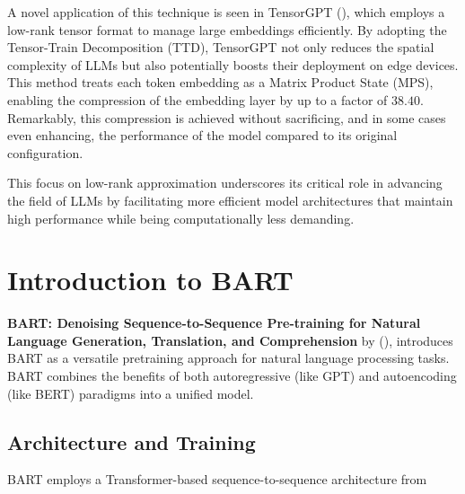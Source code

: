         A novel application of this technique is seen in TensorGPT (\cite{xu2023tensorgpt}), which employs a low-rank tensor format to manage large embeddings efficiently. By adopting the Tensor-Train Decomposition (TTD), TensorGPT not only reduces the spatial complexity of LLMs but also potentially boosts their deployment on edge devices. This method treats each token embedding as a Matrix Product State (MPS), enabling the compression of the embedding layer by up to a factor of \(38.40\). Remarkably, this compression is achieved without sacrificing, and in some cases even enhancing, the performance of the model compared to its original configuration.
        
        This focus on low-rank approximation underscores its critical role in advancing the field of LLMs by facilitating more efficient model architectures that maintain high performance while being computationally less demanding.
        

\section{Introduction to BART}
    \textbf{BART: Denoising Sequence-to-Sequence Pre-training for Natural Language Generation, Translation, and Comprehension} by (\cite{lewis2019bart}), introduces BART as a versatile pretraining approach for natural language processing tasks. BART combines the benefits of both autoregressive (like GPT) and autoencoding (like BERT) paradigms into a unified model.

    \subsection{Architecture and Training}
    BART employs a Transformer-based sequence-to-sequence architecture from 
    
